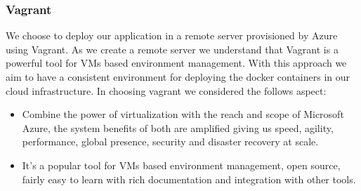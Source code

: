 \subsubsection{Vagrant}
We choose to deploy our application in a remote server provisioned by Azure using Vagrant. As we create a remote server we understand that Vagrant is a powerful tool for VMs based environment management. With this approach we aim to have a consistent environment for deploying the docker containers in our cloud infrastructure. In choosing vagrant we considered the follows aspect:
\begin{itemize}
    \item Combine the power of virtualization with the reach and scope of Microsoft Azure, the system benefits of both are amplified giving us speed, agility, performance, global presence, security and disaster recovery at scale.
    \item It's a popular tool for VMs based environment management, open source, fairly easy to learn with rich documentation and integration with other tools.
\end{itemize}


